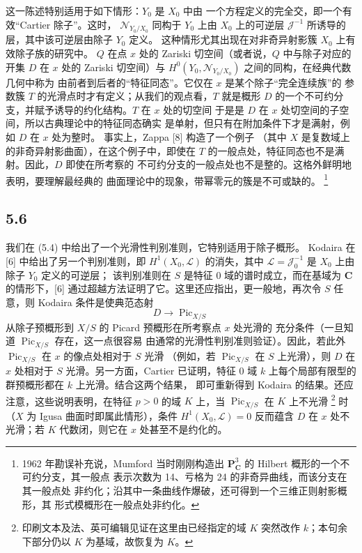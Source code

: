  这一陈述特别适用于如下情形：$Y_0$ 是 $X_0$ 中由
一个方程定义的完全交，即一个有效“Cartier 除子”。这时，
$\mathcal N_{Y_0/X_0}$ 同构于 $Y_0$ 上由 $X_0$ 上的可逆层
$\mathcal J^{-1}$ 所诱导的层，其中该可逆层由除子 $Y_0$ 定义。
这种情形尤其出现在对非奇异射影簇 $X_0$ 上有效除子族的研究中。
$Q$ 在点 $x$ 处的 Zariski 切空间（或者说，$Q$ 中与除子对应的开集
$D$ 在 $x$ 处的 Zariski 切空间）与
$H^0(Y_0,\mathcal N_{Y_0/X_0})$ 之间的同构，在经典代数几何中称为
由前者到后者的“特征同态”。它仅在 $x$ 是某个除子“完全连续族”的
参数簇 $T$ 的光滑点时才有定义；从我们的观点看，$T$ 就是概形
$D$ 的一个不可约分支，并赋予诱导的约化结构。$T$ 在 $x$ 处的切空间
于是是 $D$ 在 $x$ 处切空间的子空间，所以古典理论中的特征同态确实
是单射，但只有在附加条件下才是满射，例如 $D$ 在 $x$ 处为整时。
事实上，Zappa [8] 构造了一个例子
（其中 $X$ 是复数域上的非奇异射影曲面），在这个例子中，即使在
$T$ 的一般点处，特征同态也不是满射。因此，$D$ 即使在所考察的
不可约分支的一般点处也不是整的。这格外鲜明地表明，要理解最经典的
曲面理论中的现象，带幂零元的簇是不可或缺的。
\footnote{1962 年勘误补充说，Mumford 当时刚刚构造出
$\mathbf P^3_{\mathbf C}$ 的 Hilbert 概形的一个不可约分支，其一般点
表示次数为 14、亏格为 24 的非奇异曲线，而该分支在其一般点处
非约化；沿其中一条曲线作爆破，还可得到一个三维正则射影概形，其
形式模概形在一般点处非约化。}

\subsection*{5.6}

我们在 (5.4) 中给出了一个光滑性判别准则，它特别适用于除子概形。
Kodaira 在 [6] 中给出了另一个判别准则，即
$H^1(X_0,\mathcal L)$ 的消失，其中
$\mathcal L=\mathcal J_0^{-1}$ 是 $X_0$ 上由除子 $Y_0$ 定义的可逆层；
该判别准则在 $S$ 是特征 0 域的谱时成立，而在基域为 $\mathbf C$
的情形下，[6] 通过超越方法证明了它。这里还应指出，更一般地，再次令
$S$ 任意，则 Kodaira 条件是使典范态射
\[
D\longrightarrow\operatorname{Pic}_{X/S}
\]
从除子预概形到 $X/S$ 的 Picard 预概形在所考察点 $x$ 处光滑的
充分条件（一旦知道 $\operatorname{Pic}_{X/S}$ 存在，这一点很容易
由通常的光滑性判别准则验证）。因此，若此外
$\operatorname{Pic}_{X/S}$ 在 $x$ 的像点处相对于 $S$ 光滑
（例如，若 $\operatorname{Pic}_{X/S}$ 在 $S$ 上光滑），则 $D$
在 $x$ 处相对于 $S$ 光滑。另一方面，Cartier 已证明，特征 0 域
$k$ 上每个局部有限型的群预概形都在 $k$ 上光滑。结合这两个结果，
即可重新得到 Kodaira 的结果。还应注意，这些说明表明，在特征
$p>0$ 的域 $K$ 上，当 $\operatorname{Pic}_{X/S}$ 在 $K$ 上不光滑
\footnote{印刷文本及法、英可编辑见证在这里由已经指定的域 $K$
突然改作 $k$；本句余下部分仍以 $K$ 为基域，故恢复为 $K$。}
时（$X$ 为 Igusa 曲面时即属此情形），条件
$H^1(X_0,\mathcal L)=0$ 反而蕴含 $D$ 在 $x$ 处不光滑；若 $K$
代数闭，则它在 $x$ 处甚至不是约化的。

